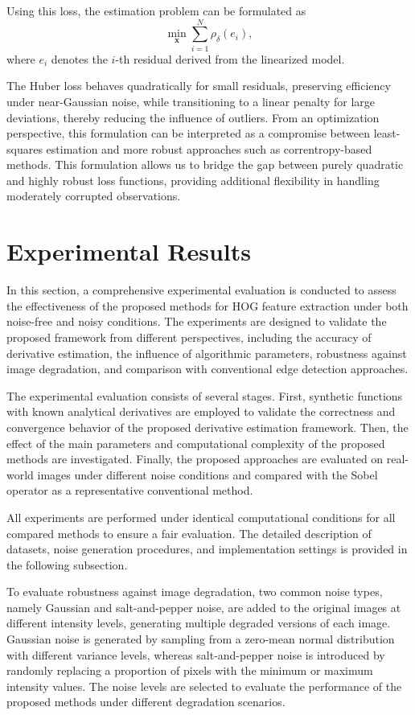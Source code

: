 \documentclass{elsarticle}
\begin{document}
Using this loss, the estimation problem can be formulated as
\begin{equation}
	\min_{\mathbf{x}} \sum_{i=1}^{N} \rho_{\delta}(e_i),
\end{equation}
where $e_i$ denotes the $i$-th residual derived from the linearized model.

The Huber loss behaves quadratically for small residuals, preserving efficiency under near-Gaussian noise, while transitioning to a linear penalty for large deviations, thereby reducing the influence of outliers. From an optimization perspective, this formulation can be interpreted as a compromise between least-squares estimation and more robust approaches such as correntropy-based methods.
This formulation allows us to bridge the gap between purely quadratic and highly robust loss functions, providing additional flexibility in handling moderately corrupted observations.
\section{Experimental Results}

In this section, a comprehensive experimental evaluation is conducted to assess the effectiveness of the proposed methods for HOG feature extraction under both noise-free and noisy conditions. The experiments are designed to validate the proposed framework from different perspectives, including the accuracy of derivative estimation, the influence of algorithmic parameters, robustness against image degradation, and comparison with conventional edge detection approaches.

The experimental evaluation consists of several stages. First, synthetic functions with known analytical derivatives are employed to validate the correctness and convergence behavior of the proposed derivative estimation framework. Then, the effect of the main parameters and computational complexity of the proposed methods are investigated. Finally, the proposed approaches are evaluated on real-world images under different noise conditions and compared with the Sobel operator as a representative conventional method.

All experiments are performed under identical computational conditions for all compared methods to ensure a fair evaluation. The detailed description of datasets, noise generation procedures, and implementation settings is provided in the following subsection.

To evaluate robustness against image degradation, two common noise types, namely Gaussian and salt-and-pepper noise, are added to the original images at different intensity levels, generating multiple degraded versions of each image. Gaussian noise is generated by sampling from a zero-mean normal distribution with different variance levels, whereas salt-and-pepper noise is introduced by randomly replacing a proportion of pixels with the minimum or maximum intensity values. The noise levels are selected to evaluate the performance of the proposed methods under different degradation scenarios.
\end{document}
